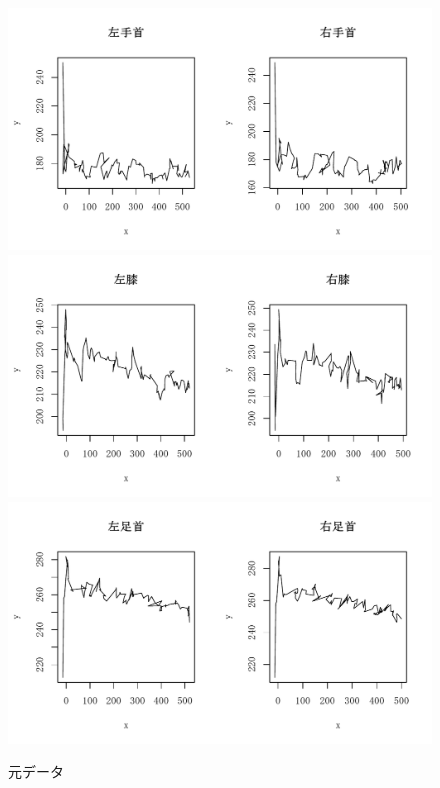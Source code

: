 \documentclass[a4j,10.5pt]{jreport}
\begin{document}
\begin{figure}
    \centering
    \includegraphics[width=0.88\linewidth]{figs/original_wrist.pdf}
    \includegraphics[width=0.88\linewidth]{figs/original_knee.pdf}
    \includegraphics[width=0.88\linewidth]{figs/original_ankle.pdf}
    \caption{元データ}
    \label{fig:originaldata}
\end{figure}
\end{document}
